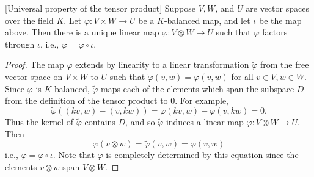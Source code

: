 \begin{thm}\label{universal-prop-tensor}[Universal property of the tensor product]  Suppose $V,W$, and $U$ are vector spaces over the field $K$.  Let $\varphi \colon V \times W \to U$ be a $K$-balanced map, and let $\iota$ be the map above.  Then there is a unique linear map $\varphi \colon V \otimes W \to U$ such that $\varphi$ factors through $\iota$, i.e., $\varphi = \varphi \circ \iota$.
\end{thm}
\begin{proof}
The map $\varphi$ extends by linearity to a linear transformation $\tilde{\varphi}$ from the free vector space on $V \times W$ to $U$ such that $\tilde{\varphi}(v , w) = \varphi (v,w)$ for all $v \in V, w \in W$.  Since $\varphi$ is $K$-balanced, $\tilde{\varphi}$ maps each of the elements which span the subspace $D$ from the definition of the tensor product to 0.  For example,
\[ \tilde{\varphi} ((kv, w) - (v, kw)) = \varphi(kv, w ) - \varphi (v, kw) = 0. \]
Thus the kernel of $\tilde{\varphi}$ contains $D$, and so $\tilde{\varphi}$ induces a linear map $\varphi \colon V \otimes W \to U$.  Then
\[ \varphi( v \otimes w) = \tilde{\varphi}( v , w) = \varphi ( v , w) \]
i.e., $\varphi = \varphi \circ \iota$. Note that $\varphi$ is completely determined by this equation since the elements $v \otimes w$ span $V \otimes W$.
\end{proof}



